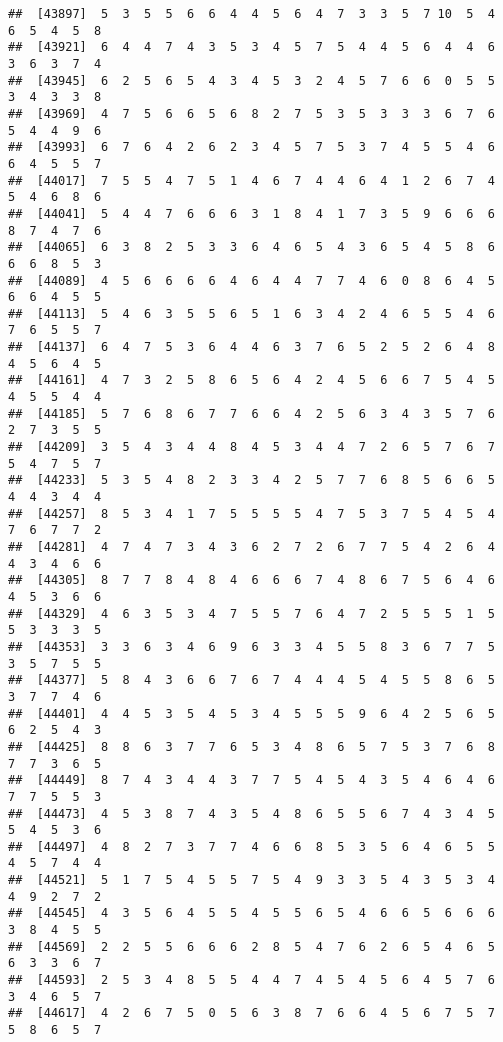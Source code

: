 \documentclass[
]{book}
\begin{document}
\begin{verbatim}
##  [43897]  5  3  5  5  6  6  4  4  5  6  4  7  3  3  5  7 10  5  4  6  5  4  5  8
##  [43921]  6  4  4  7  4  3  5  3  4  5  7  5  4  4  5  6  4  4  6  3  6  3  7  4
##  [43945]  6  2  5  6  5  4  3  4  5  3  2  4  5  7  6  6  0  5  5  3  4  3  3  8
##  [43969]  4  7  5  6  6  5  6  8  2  7  5  3  5  3  3  3  6  7  6  5  4  4  9  6
##  [43993]  6  7  6  4  2  6  2  3  4  5  7  5  3  7  4  5  5  4  6  6  4  5  5  7
##  [44017]  7  5  5  4  7  5  1  4  6  7  4  4  6  4  1  2  6  7  4  5  4  6  8  6
##  [44041]  5  4  4  7  6  6  6  3  1  8  4  1  7  3  5  9  6  6  6  8  7  4  7  6
##  [44065]  6  3  8  2  5  3  3  6  4  6  5  4  3  6  5  4  5  8  6  6  6  8  5  3
##  [44089]  4  5  6  6  6  6  4  6  4  4  7  7  4  6  0  8  6  4  5  6  6  4  5  5
##  [44113]  5  4  6  3  5  5  6  5  1  6  3  4  2  4  6  5  5  4  6  7  6  5  5  7
##  [44137]  6  4  7  5  3  6  4  4  6  3  7  6  5  2  5  2  6  4  8  4  5  6  4  5
##  [44161]  4  7  3  2  5  8  6  5  6  4  2  4  5  6  6  7  5  4  5  4  5  5  4  4
##  [44185]  5  7  6  8  6  7  7  6  6  4  2  5  6  3  4  3  5  7  6  2  7  3  5  5
##  [44209]  3  5  4  3  4  4  8  4  5  3  4  4  7  2  6  5  7  6  7  5  4  7  5  7
##  [44233]  5  3  5  4  8  2  3  3  4  2  5  7  7  6  8  5  6  6  5  4  4  3  4  4
##  [44257]  8  5  3  4  1  7  5  5  5  5  4  7  5  3  7  5  4  5  4  7  6  7  7  2
##  [44281]  4  7  4  7  3  4  3  6  2  7  2  6  7  7  5  4  2  6  4  4  3  4  6  6
##  [44305]  8  7  7  8  4  8  4  6  6  6  7  4  8  6  7  5  6  4  6  4  5  3  6  6
##  [44329]  4  6  3  5  3  4  7  5  5  7  6  4  7  2  5  5  5  1  5  5  3  3  3  5
##  [44353]  3  3  6  3  4  6  9  6  3  3  4  5  5  8  3  6  7  7  5  3  5  7  5  5
##  [44377]  5  8  4  3  6  6  7  6  7  4  4  4  5  4  5  5  8  6  5  3  7  7  4  6
##  [44401]  4  4  5  3  5  4  5  3  4  5  5  5  9  6  4  2  5  6  5  6  2  5  4  3
##  [44425]  8  8  6  3  7  7  6  5  3  4  8  6  5  7  5  3  7  6  8  7  7  3  6  5
##  [44449]  8  7  4  3  4  4  3  7  7  5  4  5  4  3  5  4  6  4  6  7  7  5  5  3
##  [44473]  4  5  3  8  7  4  3  5  4  8  6  5  5  6  7  4  3  4  5  5  4  5  3  6
##  [44497]  4  8  2  7  3  7  7  4  6  6  8  5  3  5  6  4  6  5  5  4  5  7  4  4
##  [44521]  5  1  7  5  4  5  5  7  5  4  9  3  3  5  4  3  5  3  4  4  9  2  7  2
##  [44545]  4  3  5  6  4  5  5  4  5  5  6  5  4  6  6  5  6  6  6  3  8  4  5  5
##  [44569]  2  2  5  5  6  6  6  2  8  5  4  7  6  2  6  5  4  6  5  6  3  3  6  7
##  [44593]  2  5  3  4  8  5  5  4  4  7  4  5  4  5  6  4  5  7  6  3  4  6  5  7
##  [44617]  4  2  6  7  5  0  5  6  3  8  7  6  6  4  5  6  7  5  7  5  8  6  5  7

\end{verbatim}
\end{document}

